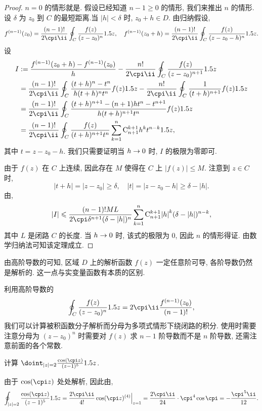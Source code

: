 \begin{proof}
  $n=0$ 的情形就是\thmCI.
  假设已经知道 $n-1\ge0$ 的情形, 我们来推出 $n$ 的情形.
  设 $\delta$ 为 $z_0$ 到 $C$ 的最短距离.当 $|h|<\delta$ 时, $z_0+h\in D$.
  由归纳假设,
  \[
    f^{(n-1)}(z_0)=\frac{(n-1)!}{2\cpi\ii}\oint_C\frac{f(z)}{(z-z_0)^n}\d z,\quad
    f^{(n-1)}(z_0+h)=\frac{(n-1)!}{2\cpi\ii}\oint_C\frac{f(z)}{(z-z_0-h)^n}\d z.
  \]
  设
  \begin{align*}
    I&:=\frac{f^{(n-1)}(z_0+h)-f^{(n-1)}(z_0)}h-\frac{n!}{2\cpi\ii}\oint_C\frac{f(z)}{(z-z_0)^{n+1}}\d z\\&
    =\frac{(n-1)!}{2\cpi\ii}\oint_C\frac{(t+h)^n-t^n}{h(t+h)^nt^n}f(z)\d z
    -\frac{n!}{2\cpi\ii}\oint_C\frac1{(t+h)^{n+1}}f(z)\d z\\&
    =\frac{(n-1)!}{2\cpi\ii}\oint_C\frac{(t+h)^{n+1}-(n+1)ht^n-t^{n+1}}{h(t+h)^{n+1}t^n}f(z)\d z\\&
    =\frac{(n-1)!}{2\cpi\ii}\oint_C\frac{f(z)}{(t+h)^{n+1}t^n}\sum_{k=1}^n\rmC_{n+1}^{k+1} h^kt^{n-k}\d z,
  \end{align*}
  其中 $t=z-z_0-h$.
  我们只需要证明当 $h\rightarrow 0$ 时, $I$ 的极限为零即可.

  由于 $f(z)$ 在 $C$ 上连续, 因此存在 $M$ 使得在 $C$ 上 $|f(z)|\le M$. 注意到 $z\in C$ 时,
  \[
    |t+h|=|z-z_0|\ge \delta,\quad
    |t|=|z-z_0-h|\ge\delta-|h|.
  \]
  由\thmGrowUp,
  \[
    |I|\le \frac{(n-1)!ML}{2\cpi\delta^{n+1}(\delta-|h|)^n}
      \sum_{k=1}^n\rmC_{n+1}^{k+1} {|h|}^k(\delta-|h|)^{n-k},
  \]
  其中 $L$ 是闭路 $C$ 的长度.
  当 $h\rightarrow0$ 时, 该式的极限为 $0$, 因此 $n$ 的情形得证.
  由数学归纳法可知该定理成立.
\end{proof}

由高阶导数的\thmCIH 可知, 区域 $D$ 上的\alert{解析函数 $f(z)$ 一定任意阶可导}, 各阶导数仍然是解析的.
这一点与实变量函数有本质的区别.

利用高阶导数的\thmCIH 
\[
   \oint_C\frac{f(z)}{(z-z_0)^{n}}\d z
  =2\cpi\ii\frac{f^{(n-1)}(z_0)}{(n-1)!},
\]
我们可以计算被积函数分子解析而分母为多项式情形下绕闭路的积分.
使用时需要注意分母为 $(z-z_0)^n$ 时需要\alert{对 $f(z)$ 求 $n-1$ 阶导数而不是 $n$ 阶导数}, 还需注意前面的各个常数.

\begin{example}
  计算 $\doint_{|z|=2}\frac{\cos(\cpi z)}{(z-1)^5}\d z$.
\end{example}

\begin{solution}
  由于 $\cos(\cpi z)$ 处处解析, 因此由\thmCIH,
  \[
    \oint_{|z|=2}\frac{\cos(\cpi z)}{(z-1)^5}\d z
    =\frac{2\cpi\ii}{4!}\cos(\cpi z)^{(4)}\Big|_{z=1}
    =\frac{2\cpi\ii}{24}\cdot \cpi^4\cos \cpi
    =-\frac{\cpi^5\ii }{12}.
  \]
\end{solution}

